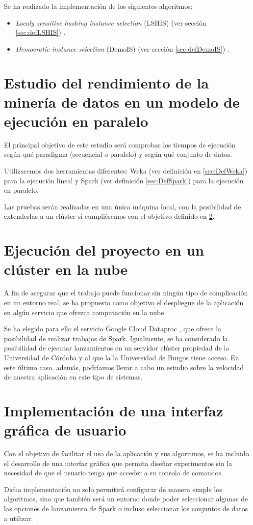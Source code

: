 Se ha realizado la implementación de los siguientes algoritmos:

\begin{itemize}
	\item \textit{Localy sensitive hashing instance selection} (LSHIS) (ver sección \ref{sec:defLSHIS}) \cite{LSHISPaper}.
	\item \textit{Democratic instance selection} (DemoIS) (ver sección \ref{sec:defDemoIS}) \cite{DemoISPaper}.
\end{itemize}


\section{Estudio del rendimiento de la minería de datos en un modelo de ejecución en paralelo}\label{sec:estudio}

El principal objetivo de este estudio será comprobar los tiempos de ejecución según qué paradigma (secuencial o paralelo) y según qué conjunto de datos.

Utilizaremos dos herramientas diferentes: Weka (ver definición en \ref{sec:DefWeka}) para la ejecución lineal y Spark (ver definición \ref{sec:DefSpark}) para la ejecución en paralelo.

Las pruebas serán realizadas en una única máquina local, con la posibilidad de extenderlas a un clúster si cumpliésemos con el objetivo definido en \ref{sec:ejecucionNube}.

\section{Ejecución del proyecto en un clúster en la nube}\label{sec:ejecucionNube}

A fin de asegurar que el trabajo puede funcionar sin ningún tipo de complicación en un entorno real, se ha propuesto como objetivo el despliegue de la aplicación en algún servicio que ofrezca computación en la nube.

Se ha elegido para ello el servicio Google Cloud Dataproc \cite{dataprocSoft}, que ofrece la posibilidad de realizar trabajos de Spark. Igualmente, se ha considerado la posibilidad de ejecutar lanzamientos en un servidor clúster propiedad de la Universidad de Córdoba y al que la la Universidad de Burgos tiene acceso. En este último caso, además, podríamos llevar a cabo un estudio sobre la velocidad de nuestra aplicación en este tipo de sistemas.


\section{Implementación de una interfaz gráfica de usuario}

Con el objetivo de facilitar el uso de la aplicación y sus algoritmos, se ha incluido el desarrollo de una interfaz gráfica que permita diseñar experimentos sin la necesidad de que el usuario tenga que acceder a su consola de comandos.

Dicha implementación no solo permitirá configurar de manera simple los algoritmos, sino que también será un entorno donde poder seleccionar algunas de las opciones de lanzamiento de Spark o incluso seleccionar los conjuntos de datos a utilizar.


